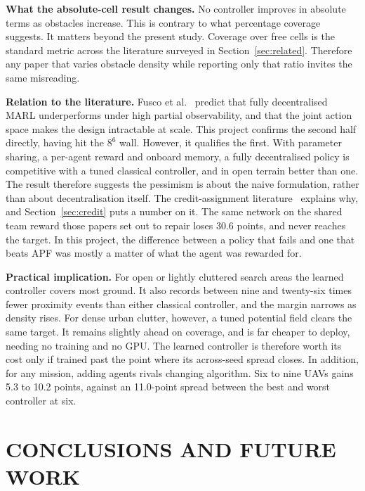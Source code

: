 \documentclass[a4paper, 10pt, conference]{ieeeconf}
\begin{document}
\textbf{What the absolute-cell result changes.} No controller improves
in absolute terms as obstacles increase. This is contrary to what
percentage coverage suggests. It matters beyond the present study.
Coverage over free cells is the standard metric across the literature
surveyed in Section~\ref{sec:related}. Therefore any paper that varies
obstacle density while reporting only that ratio invites the same
misreading.

\textbf{Relation to the literature.} Fusco et al.~\cite{fusco2025}
predict that fully decentralised MARL underperforms under high partial
observability, and that the joint action space makes the design
intractable at scale. This project confirms the second half directly,
having hit the $8^6$ wall. However, it qualifies the first. With
parameter sharing, a per-agent reward and onboard memory, a fully
decentralised policy is competitive with a tuned classical controller,
and in open terrain better than one. The result therefore suggests the
pessimism is about the naive formulation, rather than about
decentralisation itself. The credit-assignment
literature~\cite{foerster2018,sunehag2018,rashid2018} explains why,
and Section~\ref{sec:credit} puts a number on it. The same network on
the shared team reward those papers set out to repair loses 30.6
points, and never reaches the target. In this project, the difference
between a policy that fails and one that beats APF was mostly a matter
of what the agent was rewarded for.

\textbf{Practical implication.} For open or lightly cluttered search
areas the learned controller covers most ground. It also records
between nine and twenty-six times fewer proximity events than either
classical controller, and the margin narrows as density rises. For
dense urban clutter, however, a tuned potential field clears the same
target. It remains slightly ahead on coverage, and is far cheaper to
deploy, needing no training and no GPU. The learned controller is
therefore worth its cost only if trained past the point where its
across-seed spread closes. In addition, for any mission, adding agents
rivals changing algorithm. Six to nine UAVs gains 5.3 to 10.2 points,
against an 11.0-point spread between the best and worst controller at
six.

\section{CONCLUSIONS AND FUTURE WORK}\label{sec:conclusion}
\end{document}
